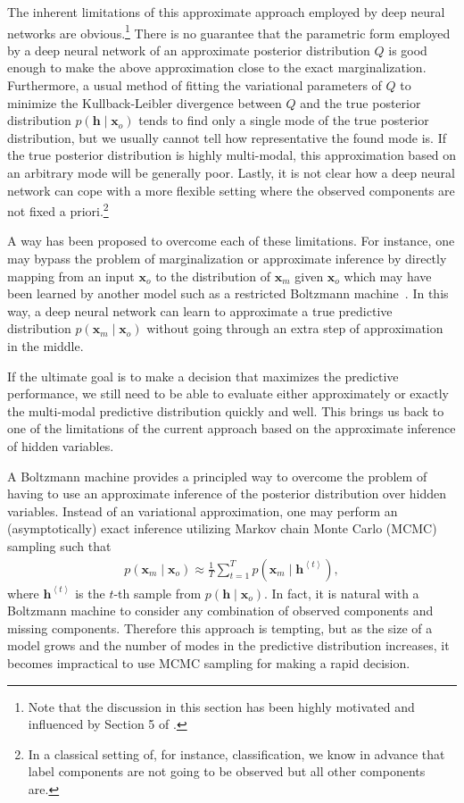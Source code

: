 \documentclass{now}
\newcommand{\qt}[1]{\left<#1\right>}
\newcommand{\vect}[1]{\mathbf{#1}}
\newcommand{\vh}[0]{\vect{h}}
\newcommand{\vx}[0]{\vect{x}}
\begin{document}
The inherent limitations of this approximate approach employed by deep neural
networks are obvious.\footnote{
    Note that the discussion in this section has been highly motivated and
    influenced by Section 5 of \citep{Bengio2013future}.
} There is no guarantee that the parametric form employed by a deep neural
network of an approximate posterior distribution $Q$ is good enough to make the
above approximation close to the exact marginalization.  Furthermore, a usual
method of fitting the variational parameters of $Q$ to minimize the
Kullback-Leibler divergence between $Q$ and the true posterior distribution
$p(\vh \mid \vx_o)$ tends to find only a single mode of the true posterior
distribution, but we usually cannot tell how representative the found mode is.
If the true posterior distribution is highly multi-modal, this approximation
based on an arbitrary mode will be generally poor.  Lastly, it is not clear how
a deep neural network can cope with a more flexible setting where the observed
components are not fixed a priori.\footnote{
    In a classical setting of, for instance, classification, we know in advance
    that label components are not going to be observed but all other components
    are.
}

A way has been proposed to overcome each of these limitations. For instance, one
may bypass the problem of marginalization or approximate inference by directly
mapping from an input $\vx_o$ to the distribution of $\vx_m$ given $\vx_o$ which
may have been learned by another model such as a restricted Boltzmann
machine~\citep{Mnih2011}. In this way, a deep neural network can learn to
approximate a true predictive distribution $p(\vx_m \mid \vx_o)$ without going
through an extra step of approximation in the middle. 

If the ultimate goal is to make a decision that maximizes the predictive
performance, we still need to be able to evaluate either approximately or
exactly the multi-modal predictive distribution quickly and well. This brings us
back to one of the limitations of the current approach based on the approximate
inference of hidden variables.

A Boltzmann machine provides a principled way to overcome the problem of having
to use an approximate inference of the posterior distribution over hidden
variables. Instead of an variational approximation, one may perform an
(asymptotically) exact inference utilizing Markov chain Monte Carlo (MCMC)
sampling such that
\begin{align*}
    p(\vx_m \mid \vx_o) \approx \frac{1}{T} \sum_{t=1}^T
    p(\vx_m \mid \vh^{\qt{t}}),
\end{align*}
where $\vh^{\qt{t}}$ is the $t$-th sample from $p(\vh \mid \vx_o)$. In fact, it
is natural with a Boltzmann machine to consider any combination of observed
components and missing components. Therefore this approach is tempting, but as
the size of a model grows and the number of modes in the predictive distribution
increases, it becomes impractical to use MCMC sampling for making a rapid
decision.
\end{document}
